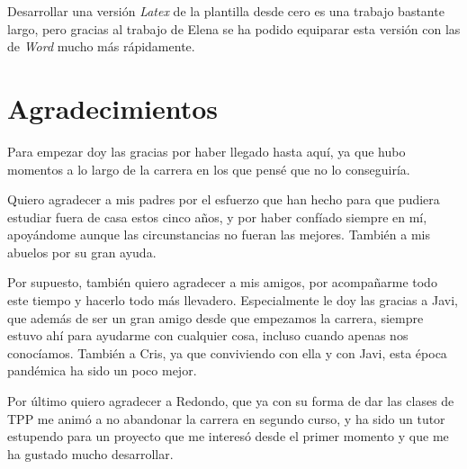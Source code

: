\documentclass[11pt]{report}
\renewcommand{\chaptermark}[1]{\markboth{\scriptsize\MakeUppercase{#1}}{}}
\renewcommand{\sectionmark}[1]{\markright{\tiny\MakeUppercase{#1}}{}}
\renewcommand{\footrulewidth}{0.4pt}
\begin{document}
Desarrollar una versión \textit{Latex} de la plantilla desde cero es una trabajo bastante largo, pero gracias al trabajo de Elena se ha podido equiparar esta versión con las de \textit{Word} mucho más rápidamente.

\thispagestyle{empty}
\chapter*{Agradecimientos}
Para empezar doy las gracias por haber llegado hasta aquí, ya que hubo momentos a lo largo de la carrera en los que pensé que no lo conseguiría.\\
\par Quiero agradecer a mis padres por el esfuerzo que han hecho para que pudiera estudiar fuera de casa estos cinco años, y por haber confíado siempre en mí, apoyándome aunque las circunstancias no fueran las mejores. También a mis abuelos por su gran ayuda.\\
\par Por supuesto, también quiero agradecer a mis amigos, por acompañarme todo este tiempo y hacerlo todo más llevadero. Especialmente le doy las gracias a Javi, que además de ser un gran amigo desde que empezamos la carrera, siempre estuvo ahí para ayudarme con cualquier cosa, incluso cuando apenas nos conocíamos. También a Cris, ya que conviviendo con ella y con Javi, esta época pandémica ha sido un poco mejor.\\
\par Por último quiero agradecer a Redondo, que ya con su forma de dar las clases de TPP me animó a no abandonar la carrera en segundo curso, y ha sido un tutor estupendo para un proyecto que me interesó desde el primer momento y que me ha gustado mucho desarrollar.

\pagestyle{fancy}
\renewcommand{\chaptermark}[1]{\markboth{\scriptsize\MakeUppercase{#1}}{}}
\renewcommand{\sectionmark}[1]{\markright{\tiny\MakeUppercase{#1}}{}}


\fancyfoot{}
\fancyfoot[R] {\thepage}
\renewcommand{\footrulewidth}{0.4pt}
\end{document}
